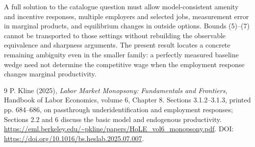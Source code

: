 \documentclass[11pt]{article}
\theoremstyle{remark}
\begin{document}
A full solution to the catalogue question must allow model-consistent
amenity and incentive responses, multiple employers and selected jobs,
measurement error in marginal products, and equilibrium changes in outside
options. Bounds (5)--(7) cannot be transported to those settings without
rebuilding the observable equivalence and sharpness arguments. The present
result locates a concrete remaining ambiguity even in the smaller family:
a perfectly measured baseline wedge need not determine the competitive
wage when the employment response changes marginal productivity.

\begin{thebibliography}{9}
 P. Kline (2025), \emph{Labor Market Monopsony:
Fundamentals and Frontiers}, Handbook of Labor Economics, volume 6,
Chapter 8. Sections 3.1.2--3.1.3, printed pp. 684--686, on passthrough
underidentification and employment responses; Sections 2.2 and 6 discuss
the basic model and endogenous productivity.
\url{https://eml.berkeley.edu/~pkline/papers/HoLE_vol6_monopsony.pdf}.
DOI: \url{https://doi.org/10.1016/bs.heslab.2025.07.007}.
\end{thebibliography}
\end{document}

